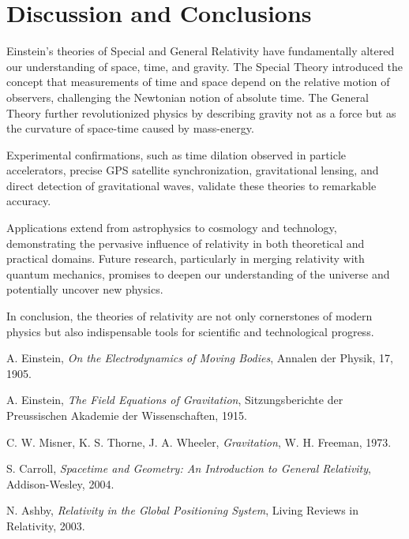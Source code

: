\documentclass[12pt,a4paper]{article}
\begin{document}
\section{Discussion and Conclusions}

Einstein's theories of Special and General Relativity have fundamentally
altered our understanding of space, time, and gravity.
The Special Theory introduced the concept that measurements of time and space
depend on the relative motion of observers, challenging the Newtonian notion
of absolute time. The General Theory further revolutionized physics by
describing gravity not as a force but as the curvature of space-time caused
by mass-energy.

Experimental confirmations, such as time dilation observed in particle
accelerators, precise GPS satellite synchronization, gravitational lensing,
and direct detection of gravitational waves, validate these theories
to remarkable accuracy.

Applications extend from astrophysics to cosmology and technology,
demonstrating the pervasive influence of relativity in both theoretical
and practical domains. Future research, particularly in merging relativity
with quantum mechanics, promises to deepen our understanding of the universe
and potentially uncover new physics.

In conclusion, the theories of relativity are not only cornerstones of modern
physics but also indispensable tools for scientific and technological progress.

\begin{thebibliography}{9}

  A. Einstein,
  \textit{On the Electrodynamics of Moving Bodies},
  Annalen der Physik, 17, 1905.

  A. Einstein,
  \textit{The Field Equations of Gravitation},
  Sitzungsberichte der Preussischen Akademie der Wissenschaften, 1915.

  C. W. Misner, K. S. Thorne, J. A. Wheeler,
  \textit{Gravitation}, W. H. Freeman, 1973.

  S. Carroll,
  \textit{Spacetime and Geometry: An Introduction to General Relativity},
  Addison-Wesley, 2004.

  N. Ashby,
  \textit{Relativity in the Global Positioning System},
  Living Reviews in Relativity, 2003.

\end{thebibliography}
\end{document}
